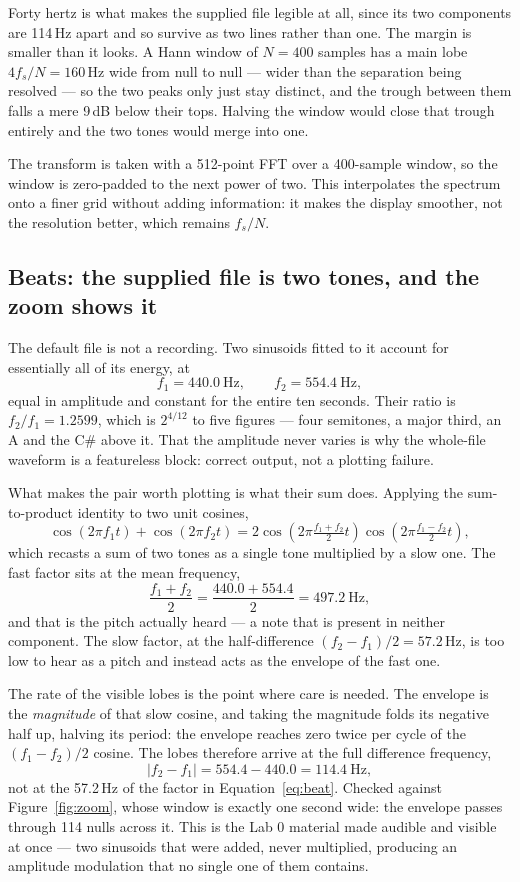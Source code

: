 \documentclass[11pt]{article}
\begin{document}
Forty hertz is what makes the supplied file legible at all, since its two
components are 114\,Hz apart and so survive as two lines rather than one. The
margin is smaller than it looks. A Hann window of $N = 400$ samples has a main
lobe $4 f_s / N = 160$\,Hz wide from null to null --- wider than the separation
being resolved --- so the two peaks only just stay distinct, and the trough
between them falls a mere 9\,dB below their tops. Halving the window would
close that trough entirely and the two tones would merge into one.

The transform is taken with a 512-point FFT over a 400-sample window, so the
window is zero-padded to the next power of two. This interpolates the spectrum
onto a finer grid without adding information: it makes the display smoother,
not the resolution better, which remains $f_s/N$.

\subsection*{Beats: the supplied file is two tones, and the zoom shows it}

The default file is not a recording. Two sinusoids fitted to it account for
essentially all of its energy, at
\[
  f_1 = 440.0\ \text{Hz}, \qquad f_2 = 554.4\ \text{Hz},
\]
equal in amplitude and constant for the entire ten seconds. Their ratio is
$f_2/f_1 = 1.2599$, which is $2^{4/12}$ to five figures --- four semitones, a
major third, an A and the C\# above it. That the amplitude never varies is why
the whole-file waveform is a featureless block: correct output, not a plotting
failure.

What makes the pair worth plotting is what their sum does. Applying the
sum-to-product identity to two unit cosines,
\begin{equation}
  \cos(2\pi f_1 t) + \cos(2\pi f_2 t)
    = 2 \cos\!\left(2\pi \tfrac{f_1 + f_2}{2} t\right)
        \cos\!\left(2\pi \tfrac{f_1 - f_2}{2} t\right),
  \label{eq:beat}
\end{equation}
which recasts a sum of two tones as a single tone multiplied by a slow one.
The fast factor sits at the mean frequency,
\[
  \frac{f_1 + f_2}{2} = \frac{440.0 + 554.4}{2} = 497.2\ \text{Hz},
\]
and that is the pitch actually heard --- a note that is present in neither
component. The slow factor, at the half-difference
$(f_2 - f_1)/2 = 57.2$\,Hz, is too low to hear as a pitch and instead acts as
the envelope of the fast one.

The rate of the visible lobes is the point where care is needed. The envelope
is the \emph{magnitude} of that slow cosine, and taking the magnitude folds
its negative half up, halving its period: the envelope reaches zero twice per
cycle of the $(f_1 - f_2)/2$ cosine. The lobes therefore arrive at the full
difference frequency,
\[
  |f_2 - f_1| = 554.4 - 440.0 = 114.4\ \text{Hz},
\]
not at the 57.2\,Hz of the factor in Equation~\ref{eq:beat}. Checked against
Figure~\ref{fig:zoom}, whose window is exactly one second wide: the envelope
passes through 114 nulls across it. This is the Lab 0 material made audible
and visible at once --- two sinusoids that were added, never multiplied,
producing an amplitude modulation that no single one of them contains.
\end{document}
